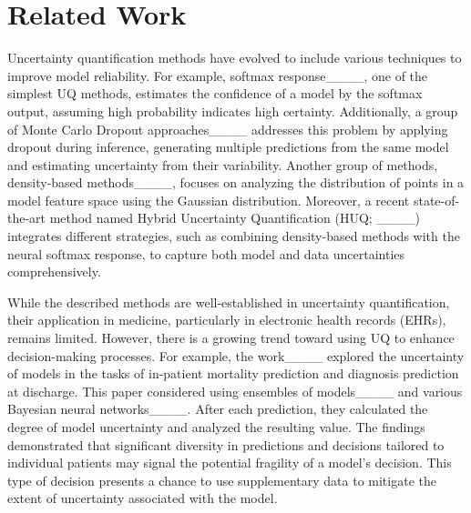 \section{Related Work}

  Uncertainty quantification methods have evolved to include various techniques to improve model reliability. For example, softmax response____, one of the simplest UQ methods, estimates the confidence of a model by the softmax output, assuming high probability indicates high certainty. Additionally, a group of Monte Carlo Dropout approaches____ addresses this problem by applying dropout during inference, generating multiple predictions from the same model and estimating uncertainty from their variability. Another group of methods, density-based methods____, focuses on analyzing the distribution of points in a model feature space using the Gaussian distribution. Moreover, a recent state-of-the-art method named Hybrid Uncertainty Quantification (HUQ; ____) integrates different strategies, such as combining density-based methods with the neural softmax response, to capture both model and data uncertainties comprehensively.

  While the described methods are well-established in uncertainty quantification, their application in medicine, particularly in electronic health records (EHRs), remains limited. However, there is a growing trend toward using UQ to enhance decision-making processes. For example, the work____ explored the uncertainty of models in the tasks of in-patient mortality prediction and diagnosis prediction at discharge. This paper considered using ensembles of models____ and various Bayesian neural networks____.   After each prediction, they calculated the degree of model uncertainty and analyzed the resulting value. The findings demonstrated that significant diversity in predictions and decisions tailored to individual patients may signal the potential fragility of a model's decision. This type of decision presents a chance to use supplementary data to mitigate the extent of uncertainty associated with the model.
  
